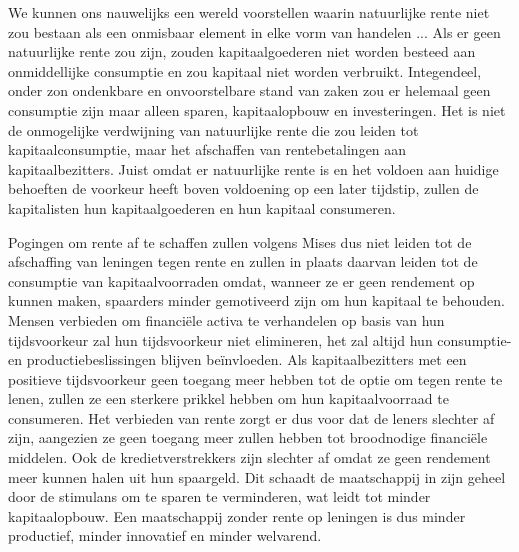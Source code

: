 \begin{blockquotebox}
We kunnen ons nauwelijks een wereld voorstellen waarin natuurlijke rente niet zou bestaan als een onmisbaar element in elke vorm van handelen ... Als er geen natuurlijke rente zou zijn, zouden kapitaalgoederen niet worden besteed aan onmiddellijke consumptie en zou kapitaal niet worden verbruikt. Integendeel, onder zo\textquotesingle n ondenkbare en onvoorstelbare stand van zaken zou er helemaal geen consumptie zijn maar alleen sparen, kapitaalopbouw en investeringen. Het is niet de onmogelijke verdwijning van natuurlijke rente die zou leiden tot kapitaalconsumptie, maar het afschaffen van rentebetalingen aan kapitaalbezitters. Juist omdat er natuurlijke rente is en het voldoen aan huidige behoeften de voorkeur heeft boven voldoening op een later tijdstip, zullen de kapitalisten hun kapitaalgoederen en hun kapitaal consumeren.\footnotemark
\end{blockquotebox}
\autocite{161}

Pogingen om rente af te schaffen zullen volgens Mises dus niet leiden tot de afschaffing van leningen tegen rente en zullen in plaats daarvan leiden tot de consumptie van kapitaalvoorraden omdat, wanneer ze er geen rendement op kunnen maken, spaarders minder gemotiveerd zijn om hun kapitaal te behouden. Mensen verbieden om financiële activa te verhandelen op basis van hun tijdsvoorkeur zal hun tijdsvoorkeur niet elimineren, het zal altijd hun consumptie- en productiebeslissingen blijven beïnvloeden. Als kapitaalbezitters met een positieve tijdsvoorkeur geen toegang meer hebben tot de optie om tegen rente te lenen, zullen ze een sterkere prikkel hebben om hun kapitaalvoorraad te consumeren. Het verbieden van rente zorgt er dus voor dat de leners slechter af zijn, aangezien ze geen toegang meer zullen hebben tot broodnodige financiële middelen. Ook de kredietverstrekkers zijn slechter af omdat ze geen rendement meer kunnen halen uit hun spaargeld. Dit schaadt de maatschappij in zijn geheel door de stimulans om te sparen te verminderen, wat leidt tot minder kapitaalopbouw. Een maatschappij zonder rente op leningen is dus minder productief, minder innovatief en minder welvarend.

